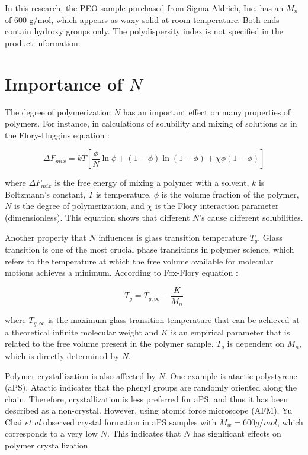 In this research, the PEO sample purchased from Sigma Aldrich, Inc. has an $M_{n}$ of 600 g/mol, which appears as waxy solid at room temperature. Both ends contain hydroxy groups only. The polydispersity index is not specified in the product information.

\section{Importance of $N$}

The degree of polymerization $N$ has an important effect on many properties of polymers. For instance, in calculations of solubility and mixing of solutions as in the Flory-Huggins equation \cite{Rubinstein2003}: 

\begin{equation}
\label{eqn_free energy}
\Delta F_{mix} = kT [\dfrac{\phi}{N} \ln \phi + (1 - \phi) \ln (1 - \phi) + \chi \phi (1 - \phi)]
\end{equation}

\noindent
where $\Delta F_{mix}$ is the free energy of mixing a polymer with a solvent, $k$ is Boltzmann's constant, $T$ is temperature, $\phi$ is the volume fraction of the polymer, $N$ is the degree of polymerization, and $\chi$ is the Flory interaction parameter (dimensionless).
This equation shows that different $N$'s cause different solubilities. 

Another property that $N$ influences is glass transition temperature $T_{g}$. Glass transition is one of the most crucial phase transitions in polymer science, which refers to the temperature at which the free volume available for molecular motions achieves a minimum. According to Fox-Flory equation \cite{Fox1950a}:

\begin{equation}
\label{eqn_fox-flory}
T_{g} = T_{g,\infty} - \dfrac{K}{M_{n}}
\end{equation}

\noindent
where $T_{g,\infty}$ is the maximum glass transition temperature that can be achieved at a theoretical infinite molecular weight and $K$ is an empirical parameter that is related to the free volume present in the polymer sample. $T_{g}$ is dependent on $M_{n}$, which is directly determined by $N$.

Polymer crystallization is also affected by $N$. One example is atactic polystyrene (aPS). Atactic indicates that the phenyl groups are randomly oriented along the chain. Therefore, crystallization is less preferred for aPS, and thus it has been described as a non-crystal. However, using atomic force microscope (AFM), Yu Chai \textit{et al} \cite{Chai2016} observed crystal formation in aPS samples with $M_{w} = 600 g/mol$, which corresponds to a very low $N$. This indicates that $N$ has significant effects on polymer crystallization.

